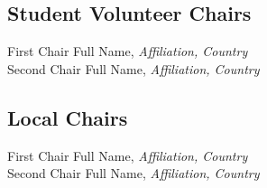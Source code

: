 \subsection{Student Volunteer Chairs}
First Chair Full Name, \emph{Affiliation, Country}\\
Second Chair Full Name, \emph{Affiliation, Country}\\

\subsection{Local Chairs}
First Chair Full Name, \emph{Affiliation, Country}\\
Second Chair Full Name, \emph{Affiliation, Country}\\